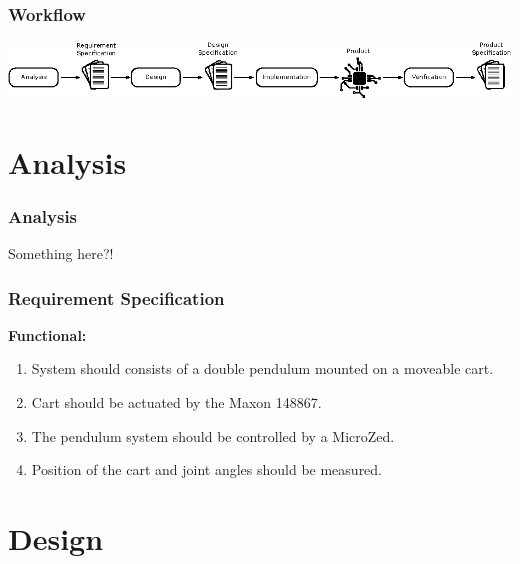 \documentclass[mathserif]{beamer}
\begin{document}
\begin{frame}[c]\frametitle{Workflow}
\centering
\includegraphics[width=\textwidth]{graphics/workflow}    
\end{frame}


\section{Analysis}

\begin{frame}[t]\frametitle{Analysis}
    Something here?!
\end{frame}

\begin{frame}[c]\frametitle{Requirement Specification}

\textbf{Functional:}
\begin{enumerate}
	\item System should consists of a double pendulum mounted on a moveable cart.
	\item Cart should be actuated by the Maxon 148867. 
	\item The pendulum system should be controlled by a MicroZed.
	\item \alert{Position of the cart and joint angles should be measured.}
\end{enumerate}

\end{frame}

\section{Design}
\end{document}
